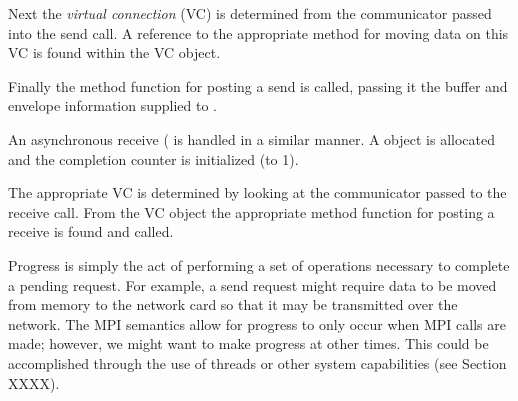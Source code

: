 \begin{comment}
  \emph{do we want to say something about the buffer in here?}  The buffer does
  not become an issue until we call the method's post function passing it the
  buffer.
\end{comment}

%
Next the \emph{virtual connection} (VC) is determined from the communicator
passed into the send call.  A reference to the appropriate method for moving
data on this VC is found within the VC object.

%
Finally the method function for posting a send is called, passing it the buffer
and envelope information supplied to . 



An asynchronous receive ( is handled in a similar manner.  A
 object is allocated and the completion counter is
initialized (to 1).
%


%
The appropriate VC is determined by looking at the communicator passed to the
receive call.  From the VC object the appropriate method function for posting a
receive is found and called.
 
% 

\begin{comment}
  \emph{is it ok to use the term operation in here?  is there a better one?  we
    could use the term ``request''.  operation isn't too confusing right now,
    but it may be later.  then again, the MPI standard talks about ``posting
    nonblocking operations''...}
\end{comment}

Progress is simply the act of performing a set of operations necessary to
complete a pending request.  For example, a send request might require data to
be moved from memory to the network card so that it may be transmitted over the
network.
%
The MPI semantics allow for progress to only occur when MPI calls
are made; however, we might want to make progress at other times.  This could
be accomplished through the use of threads or other system capabilities (see
Section XXXX).


